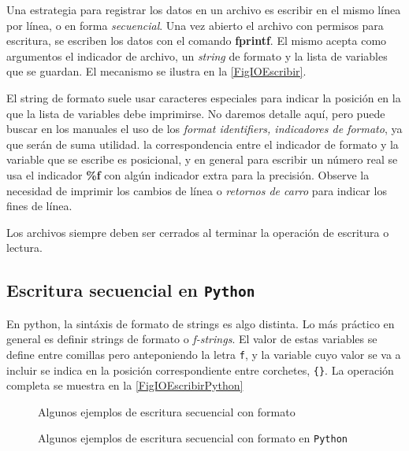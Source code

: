 
Una estrategia para registrar los datos en un archivo es 
escribir en el mismo línea por línea, o en forma \emph{secuencial}.
Una vez abierto el archivo con permisos para escritura, 
se escriben los datos con el comando \textbf{fprintf}. 
El mismo acepta como argumentos el indicador de archivo, 
un \emph{string} de formato y la lista de variables 
que se guardan. El mecanismo se ilustra en la 
\autoref{FigIOEscribir}.

El string de formato suele usar caracteres especiales para indicar
la posición en la que la lista de variables debe 
imprimirse. No daremos detalle aquí, pero puede
buscar en los manuales el uso de los \emph{format 
identifiers, indicadores de formato}, ya que serán 
de suma utilidad. la correspondencia entre el 
indicador de formato y la variable que se escribe
es posicional, y en general para escribir un número 
real se usa el indicador \textbf{\%f} con algún 
indicador extra para la precisión. 
Observe la necesidad de imprimir los cambios de línea
o \emph{retornos de carro} para indicar los fines de línea. 

Los archivos siempre deben ser cerrados al terminar la operación 
de escritura o lectura. 

\subsection{Escritura secuencial en \texttt{Python}}

En python, la sintáxis de formato de strings es algo distinta.
Lo más práctico en general es definir strings de formato o \emph{f-strings}. 
El valor de estas variables se define entre comillas pero anteponiendo la letra 
\texttt{f}, y la variable cuyo valor se va a incluir se indica en la posición 
correspondiente entre corchetes, \texttt{\{\}}. 
La operación completa se muestra en la \autoref{FigIOEscribirPython}

\begin{figure}
  \caption{Algunos ejemplos de escritura secuencial con formato\label{FigIOEscribir}}
\end{figure}

\begin{figure}
    \caption{Algunos ejemplos de escritura secuencial con formato en \texttt{Python}\label{FigIOEscribirPython}}
\end{figure}

